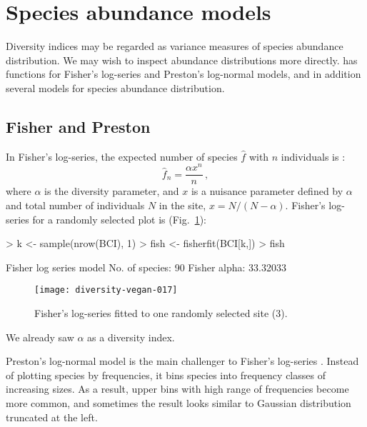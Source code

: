 \documentclass[a4paper,10pt,twocolumn]{article}
\begin{document}
\section{Species abundance models}

Diversity indices may be regarded as variance measures of species
abundance distribution.  We may wish to inspect abundance
distributions more directly.   has functions for
Fisher's log-series and Preston's log-normal models, and in addition
several models for species abundance distribution.

\subsection{Fisher and Preston}

In Fisher's log-series, the expected number of species $\hat f$ with $n$
individuals is \citep{FisherEtal43}:
\begin{equation}
\hat f_n = \frac{\alpha x^n}{n} \,,
\end{equation}
where $\alpha$ is the diversity parameter, and $x$ is a nuisance
parameter defined by $\alpha$ and total number
of individuals $N$ in the site, $x = N/(N-\alpha)$.  Fisher's
log-series for a randomly selected plot is (Fig.~\ref{fig:fisher}):
\begin{Schunk}
\begin{Sinput}
> k <- sample(nrow(BCI), 1)
> fish <- fisherfit(BCI[k,])
> fish
\end{Sinput}
\begin{Soutput}
Fisher log series model
No. of species: 90 
Fisher alpha:   33.32033 
\end{Soutput}
\end{Schunk}
\begin{figure}
\texttt{[image: diversity-vegan-017]}
\caption{Fisher's log-series fitted to one randomly selected site
  (3).}
\label{fig:fisher}
\end{figure}
We already saw $\alpha$ as a diversity index.

Preston's log-normal model is the main challenger to Fisher's
log-series \citep{Preston48}.  Instead of plotting species by
frequencies, it bins species into frequency classes of increasing
sizes.  As a result, upper bins with high range of frequencies become
more common, and sometimes the result looks similar to Gaussian
distribution truncated at the left.
\end{document}
